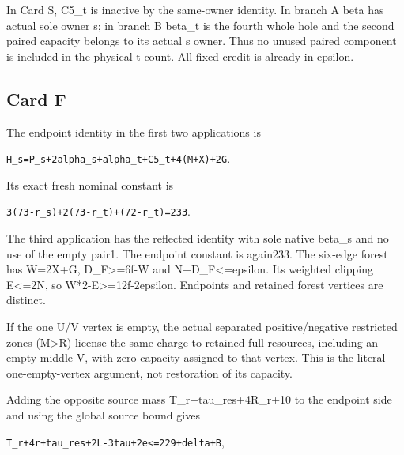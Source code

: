\documentclass[10pt,a4paper]{article}
\theoremstyle{definition}
\begin{document}
In Card S,\allowbreak{} C5\_\allowbreak{}t is inactive by the same-owner identity. In branch A
beta has actual sole owner s; in branch B beta\_\allowbreak{}t is the fourth whole
hole and the second paired capacity belongs to its actual s owner. Thus
no unused paired component is included in the physical t count. All
fixed credit is already in epsilon.

\hypertarget{card-f}{%
\subsection{Card F}\label{card-f}}

The endpoint identity in the first two applications is

\texttt{H\_\allowbreak{}\allowbreak{}s=\allowbreak{}P\_\allowbreak{}\allowbreak{}s+\allowbreak{}2alpha\_\allowbreak{}\allowbreak{}s+\allowbreak{}alpha\_\allowbreak{}\allowbreak{}t+\allowbreak{}C5\_\allowbreak{}\allowbreak{}t+\allowbreak{}4(M+\allowbreak{}X)+\allowbreak{}2G}.

Its exact fresh nominal constant is

\texttt{3(73-r\_\allowbreak{}\allowbreak{}s)+\allowbreak{}2(73-r\_\allowbreak{}\allowbreak{}t)+\allowbreak{}(72-r\_\allowbreak{}\allowbreak{}t)=\allowbreak{}233}.

The third application has the reflected identity with sole native
beta\_\allowbreak{}s and no use of the empty pair1. The endpoint constant is
again233. The six-edge forest has W=\allowbreak{}2X+\allowbreak{}G,\allowbreak{} D\_\allowbreak{}F\textgreater=\allowbreak{}6f-W and
N+\allowbreak{}D\_\allowbreak{}F\textless=\allowbreak{}epsilon. Its weighted clipping E\textless=\allowbreak{}2N,\allowbreak{} so
W*2-E\textgreater=\allowbreak{}12f-2epsilon. Endpoints and retained forest vertices
are distinct.

If the one U/V vertex is empty,\allowbreak{} the actual separated positive/negative
restricted zones (M\textgreater R) license the same charge to retained
full resources,\allowbreak{} including an empty middle V,\allowbreak{} with zero capacity assigned
to that vertex. This is the literal one-empty-vertex argument,\allowbreak{} not
restoration of its capacity.

Adding the opposite source mass T\_\allowbreak{}r+\allowbreak{}tau\_\allowbreak{}res+\allowbreak{}4R\_\allowbreak{}r+\allowbreak{}10 to the endpoint
side and using the global source bound gives

\texttt{T\_\allowbreak{}\allowbreak{}r+\allowbreak{}4r+\allowbreak{}tau\_\allowbreak{}\allowbreak{}res+\allowbreak{}2L-3tau+\allowbreak{}2e<=\allowbreak{}229+\allowbreak{}delta+\allowbreak{}B},\allowbreak{}
\end{document}
